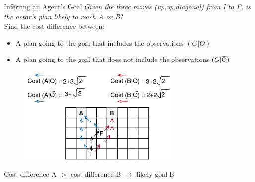 \begin{frame}{Inferring an Agent's Goal}
\textit{Given the three moves (up,up,diagonal) from I to F, is the actor's plan likely to reach A or B}?\\

Find the cost difference between:
\begin{itemize}
\item A plan going to the goal that includes the observations $(G|O)$
\item A plan going to the goal that does not include the observations $(G|\overline{\rm O})$
\end{itemize}

\begin{figure}[!ht]
  \centering
	\includegraphics[width=0.7\textwidth]{img/rg.png}
\end{figure}
Cost difference A $>$ cost difference B $\rightarrow$ likely goal B

\end{frame}